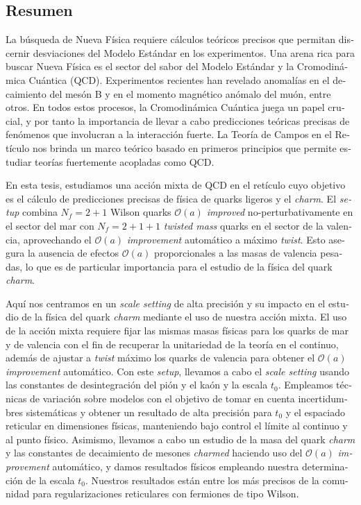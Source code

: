 \vfill

\begin{otherlanguage}{spanish}
\chapter*{Resumen}

La búsqueda de Nueva Física requiere cálculos teóricos precisos que permitan discernir desviaciones del Modelo Estándar en los experimentos. Una arena rica para buscar Nueva Física es el sector del sabor del Modelo Estándar y la Cromodinámica Cuántica (QCD). Experimentos recientes han revelado anomalías en el decaimiento del mesón B y en el momento magnético anómalo del muón, entre otros. En todos estos procesos, la Cromodinámica Cuántica juega un papel crucial, y por tanto la importancia de llevar a cabo predicciones teóricas precisas de fenómenos que involucran a la interacción fuerte. La Teoría de Campos en el Retículo nos brinda un marco teórico basado en primeros principios que permite estudiar teorías fuertemente acopladas como QCD.

En esta tesis, estudiamos una acción mixta de QCD en el retículo cuyo objetivo es el cálculo de predicciones precisas de física de quarks ligeros y el \textit{charm}. El \textit{setup} combina $N_f=2+1$ Wilson quarks $\mathcal{O}(a)$ \textit{improved} no-perturbativamente en el sector del mar con $N_f=2+1+1$ \textit{twisted mass} quarks en el sector de la valencia, aprovechando el $\mathcal{O}(a)$ \textit{improvement} automático a máximo \textit{twist}. Esto asegura la ausencia de efectos $\mathcal{O}(a)$ proporcionales a las masas de valencia pesadas, lo que es de particular importancia para el estudio de la física del quark \textit{charm}.

Aquí nos centramos en un \textit{scale setting} de alta precisión y su impacto en el estudio de la física del quark \textit{charm} mediante el uso de nuestra acción mixta. El uso de la acción mixta requiere fijar las mismas masas físicas para los quarks de mar y de valencia con el fin de recuperar la unitariedad de la teoría en el continuo, además de ajustar a \textit{twist} máximo los quarks de valencia para obtener el $\mathcal{O}(a)$ \textit{improvement} automático. Con este \textit{setup}, llevamos a cabo el \textit{scale setting} usando las constantes de desintegración del pión y el kaón y la escala $t_0$. Empleamos técnicas de variación sobre modelos con el objetivo de tomar en cuenta incertidumbres sistemáticas y obtener un resultado de alta precisión para $t_0$ y el espaciado reticular en dimensiones físicas, manteniendo bajo control el límite al continuo y al punto físico. Asimismo, llevamos a cabo un estudio de la masa del quark \textit{charm} y las constantes de decaimiento de mesones \textit{charmed} haciendo uso del $\mathcal{O}(a)$ \textit{improvement} automático, y damos resultados físicos empleando nuestra determinación de la escala $t_0$. Nuestros resultados están entre los más precisos de la comunidad para regularizaciones reticulares con fermiones de tipo Wilson.

\end{otherlanguage}

\endgroup

\vfill
